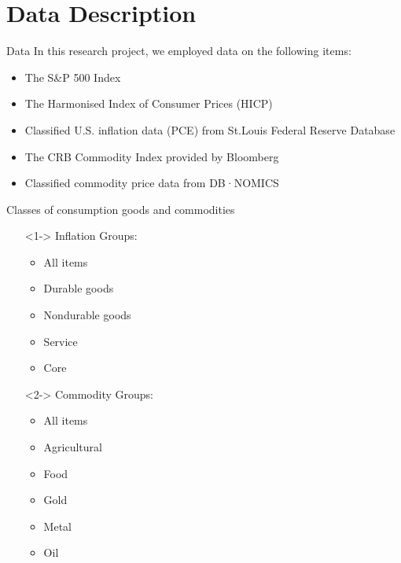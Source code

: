 \section{Data Description}
    \begin{frame}{Data}
    In this research project, we employed data on the following items:
    \begin{itemize}
    \item The S\&P 500 Index
    \item The Harmonised
Index of Consumer Prices (HICP)
    \item Classified U.S. inflation data (PCE) from St.Louis Federal Reserve Database
    \item The CRB Commodity Index provided by Bloomberg
    \item Classified commodity price data from DB·NOMICS
    \end{itemize}
    \end{frame}
    
    \begin{frame}{Classes of consumption goods and commodities}
    \begin{itemize}
    \item[]<1->    Inflation Groups:
        \begin{itemize}
         \item All items
         \item Durable goods
         \item Nondurable goods
         \item Service
         \item Core
         \end{itemize}
    \item[]<2->    Commodity Groups:
        \begin{itemize}
         \item All items
         \item Agricultural 
         \item Food
         \item Gold
         \item Metal
         \item Oil
         \end{itemize}
    \end{itemize}
    \end{frame}
    
